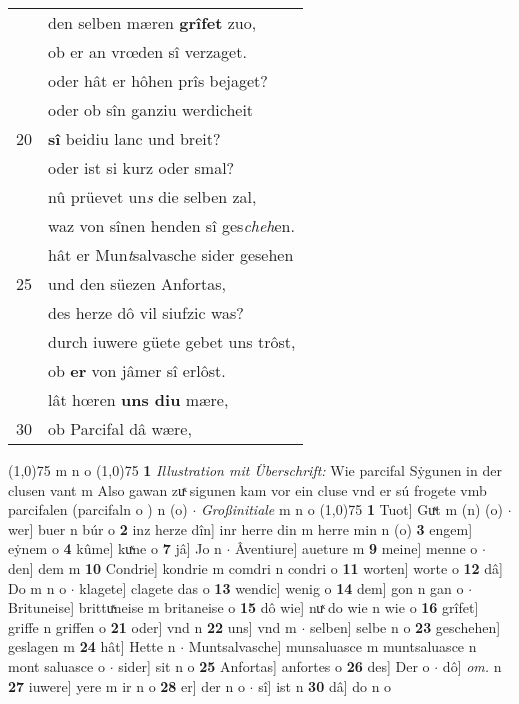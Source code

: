 \documentclass[8pt,a4paper,notitlepage]{article}
\begin{document}
\begin{table}[ht]
\begin{minipage}[t]{0.5\linewidth}
\begin{tabular}{rl}
 & den selben mæren \textbf{grîfet} zuo,\\ 
 & ob er an vrœden sî verzaget.\\ 
 & oder hât er hôhen prîs bejaget?\\ 
 & oder ob sîn ganziu werdicheit\\ 
20 & \textbf{sî} beidiu lanc und breit?\\ 
 & oder ist si kurz oder smal?\\ 
 & nû prüevet un\textit{s} die selben zal,\\ 
 & waz von sînen henden sî ges\textit{cheh}en.\\ 
 & hât er Mun\textit{t}salvasche sider gesehen\\ 
25 & und den süezen Anfortas,\\ 
 & des herze dô vil siufzic was?\\ 
 & durch iuwere güete gebet uns trôst,\\ 
 & ob \textbf{er} von jâmer sî erlôst.\\ 
 & lât hœren \textbf{uns diu} mære,\\ 
30 & ob Parcifal dâ wære,\\ 
\end{tabular}
\scriptsize
\line(1,0){75} \newline
m n o \newline
\line(1,0){75} \newline
\textbf{1} \textit{Illustration mit Überschrift:} Wie parcifal Sẏgunen in der clusen vant m  Also gawan zuͯ sigunen kam vor ein cluse vnd er sú frogete vmb parcifalen (parcifaln o  ) n (o)   $\cdot$ \textit{Großinitiale} m n o  \newline
\line(1,0){75} \newline
\textbf{1} Tuot] Guͯt m (n) (o)  $\cdot$ wer] buer n búr o \textbf{2} inz herze dîn] inr herre din m herre min n (o) \textbf{3} engem] eẏnem o \textbf{4} kûme] kuͯne o \textbf{7} jâ] Jo n  $\cdot$ Âventiure] aueture m \textbf{9} meine] menne o  $\cdot$ den] dem m \textbf{10} Condrie] kondrie m comdri n condri o \textbf{11} worten] worte o \textbf{12} dâ] Do m n o  $\cdot$ klagete] clagete das o \textbf{13} wendic] wenig o \textbf{14} dem] gon n gan o  $\cdot$ Brituneise] brittuͯneise m britaneise o \textbf{15} dô wie] nuͯ do wie n wie o \textbf{16} grîfet] griffe n griffen o \textbf{21} oder] vnd n \textbf{22} uns] vnd m  $\cdot$ selben] selbe n o \textbf{23} geschehen] geslagen m \textbf{24} hât] Hette n  $\cdot$ Muntsalvasche] munsaluasce m muntsaluasce n mont saluasce o  $\cdot$ sider] sit n o \textbf{25} Anfortas] anfortes o \textbf{26} des] Der o  $\cdot$ dô] \textit{om.} n \textbf{27} iuwere] yere m ir n o \textbf{28} er] der n o  $\cdot$ sî] ist n \textbf{30} dâ] do n o \newline
\end{minipage}
\end{table}
\end{document}
